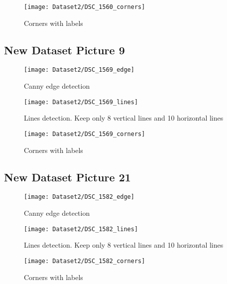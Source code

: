 \documentclass[11pt]{article}
\begin{document}
\begin{figure}[H]
\centering
\texttt{[image: Dataset2/DSC\_1560\_corners]}
\caption{Corners with labels}
\label{}
\end{figure}


\subsection*{New Dataset Picture 9}

\begin{figure}[H]
\centering
\texttt{[image: Dataset2/DSC\_1569\_edge]}
\caption{Canny edge detection}
\label{}
\end{figure}

\begin{figure}[H]
\centering
\texttt{[image: Dataset2/DSC\_1569\_lines]}
\caption{Lines detection. Keep only 8 vertical lines and 10 horizontal lines}
\label{}
\end{figure}

\begin{figure}[H]
\centering
\texttt{[image: Dataset2/DSC\_1569\_corners]}
\caption{Corners with labels}
\label{}
\end{figure}


\subsection*{New Dataset Picture 21}

\begin{figure}[H]
\centering
\texttt{[image: Dataset2/DSC\_1582\_edge]}
\caption{Canny edge detection}
\label{}
\end{figure}

\begin{figure}[H]
\centering
\texttt{[image: Dataset2/DSC\_1582\_lines]}
\caption{Lines detection. Keep only 8 vertical lines and 10 horizontal lines}
\label{}
\end{figure}

\begin{figure}[H]
\centering
\texttt{[image: Dataset2/DSC\_1582\_corners]}
\caption{Corners with labels}
\label{}
\end{figure}
\end{document}
